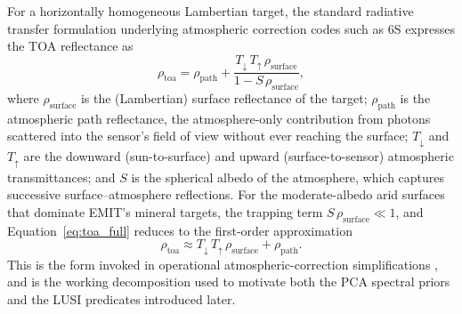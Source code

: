 \documentclass[preprint,12pt]{elsarticle}
\begin{document}
For a horizontally homogeneous Lambertian target, the standard radiative transfer formulation underlying atmospheric correction codes such as 6S \cite{vermote1997sixs} expresses the TOA reflectance as
\begin{equation}
\rho_{\text{toa}}
=
\rho_{\text{path}}
+
\frac{T_{\downarrow}\,T_{\uparrow}\,\rho_{\text{surface}}}{1 - S\,\rho_{\text{surface}}},
\label{eq:toa_full}
\end{equation}
where $\rho_{\text{surface}}$ is the (Lambertian) surface reflectance of the target; 
$\rho_{\text{path}}$ is the atmospheric path reflectance, the atmosphere-only contribution from photons scattered into the sensor's field of view without ever reaching the surface; 
$T_{\downarrow}$ and $T_{\uparrow}$ are the downward (sun-to-surface) and upward (surface-to-sensor) atmospheric transmittances; 
and $S$ is the spherical albedo of the atmosphere, which captures successive surface--atmosphere reflections. 
For the moderate-albedo arid surfaces that dominate EMIT's mineral targets, the trapping term $S\,\rho_{\text{surface}} \ll 1$, and Equation~\ref{eq:toa_full} reduces to the first-order approximation
\begin{equation}
\rho_{\text{toa}} \approx T_{\downarrow}\,T_{\uparrow}\,\rho_{\text{surface}} + \rho_{\text{path}}.
\label{eq:toa_decomp}
\end{equation}
This is the form invoked in operational atmospheric-correction simplifications \cite{richter_atcor_atbd}, and is the working decomposition used to motivate both the PCA spectral priors and the LUSI predicates introduced later.
\end{document}
